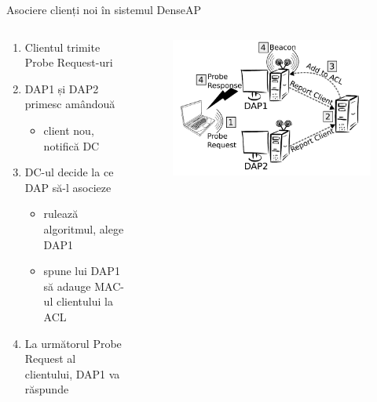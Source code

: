 \begin{frame}{Asociere clienți noi în sistemul DenseAP}
  \begin{columns}
  \begin{column}{0.5\linewidth}
    \begin{enumerate}
      \item Clientul trimite Probe Request-uri
      \item DAP1 și DAP2 primesc amândouă
      \begin{itemize}
        \item client nou, notifică DC
      \end{itemize}
      \item DC-ul decide la ce DAP să-l asocieze
      \begin{itemize}
        \item rulează algoritmul, alege DAP1
        \item spune lui DAP1 să adauge MAC-ul clientului la ACL
      \end{itemize}
      \item La următorul Probe Request al clientului, DAP1 va răspunde
    \end{enumerate}
  \end{column}
  \begin{column}{0.5\linewidth}
    \begin{figure}
      \includegraphics[scale=0.20]{img/fig2.png}
    \end{figure}
  \end{column}
  \end{columns}
\end{frame}
